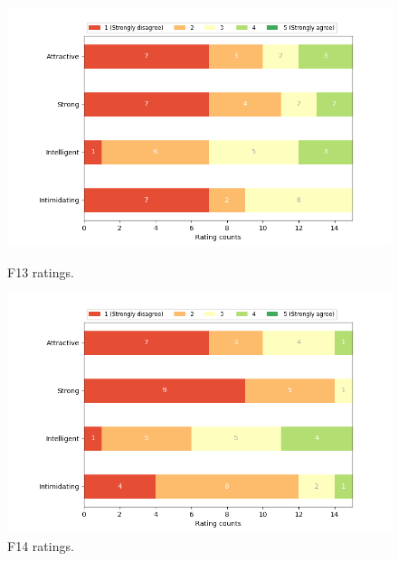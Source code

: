 \begin{figure}[H]
  \includegraphics[width=\linewidth]{Survey/FRatings/avatar_f13.png}
  \caption{F13 ratings.}
\endminipage\hfill
{}
  \includegraphics[width=\linewidth]{Survey/FRatings/avatar_f14.png}
  \caption{F14 ratings.}
\endminipage\hfill
\end{figure}

